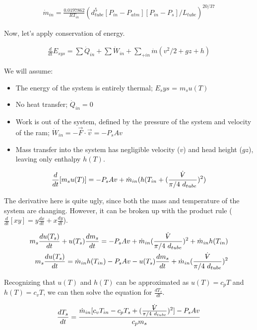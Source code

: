 \documentclass[10pt,letterpaper]{article}
\newcommand{\volume}{{\ooalign{\hfil$V$\hfil\cr\kern0.08em--\hfil\cr}}}
\begin{document}
	\begin{align} \label{eq:sup_mdot}
		\dot{m}_{in} = \frac{0.0197862}{R T_{in}} (d_{tube}^5 [P_{in}-P_{atm}] [P_{in}-P_{s}]/L_{tube})^{20/37}
	\end{align}
	
	Now, let's apply conservation of energy.
	
	\begin{align}
		\frac{d}{dt} E_{sys} = \sum \dot{Q}_{in} + \sum \dot{W}_{in} + \sum_{+in} \dot{m} (v^2/2 + gz + h) \nonumber
	\end{align}
	
	We will assume:
	\begin{itemize}
		\item The energy of the system is entirely thermal; $E_sys$ = $m_s u(T)$
		\item No heat transfer; $\dot{Q}_{in} = 0$
		\item Work is out of the system, defined by the pressure of the system and velocity of the ram; $\dot{W}_{in} = - \vec{F} \cdot \vec{v} = - P_s A v$
		\item Mass transfer into the system has negligible velocity ($v$) and head height ($gz$), leaving only enthalpy $h(T)$.
	\end{itemize}		
	
	\begin{align}
		\frac{d}{dt} [m_s u(T)] = - P_s A v + \dot{m}_{in} (h(T_{in} + (\frac{\dot{\volume}}{\pi / 4 \ d_{tube}})^2) \nonumber
	\end{align}
	
	The derivative here is quite ugly, since both the mass and temperature of the system are changing. However, it can be broken up with the product rule ($\frac{d}{dt}[xy] = y \frac{dx}{dt} + x \frac{dy}{dt}$).
	
	\begin{align} 
		m_s \frac{d u(T_s)}{dt} + u(T_s) \frac{d m_s}{dt} = - P_s A v + \dot{m}_{in}  (\frac{\dot{\volume}}{\pi / 4 \ d_{tube}})^2 + \dot{m}_{in} h(T_{in}) \nonumber \\
		m_s \frac{d u(T_s)}{dt} = \dot{m}_{in} h(T_{in}) - P_s A v - u(T_s) \frac{d m_s}{dt} + \dot{m}_{in}  (\frac{\dot{\volume}}{\pi / 4 \ d_{tube}})^2\nonumber
	\end{align}
	
	Recognizing that $u(T)$ and $h(T)$ can be approximated as $u(T) = c_p T$ and $h(T) = c_v T$, we can then solve the equation for $\frac{dT_s}{dt}$.
	
	\begin{align} \label{eq:ddt_T}
		\frac{d T_s}{dt} = \frac{ \dot{m}_{in}[ c_v T_{in} - c_p T_s + (\frac{\dot{\volume}}{\pi / 4 \ d_{tube}})^2]     - P_s A v}{c_p m_s}
	\end{align}
	
\end{document}
